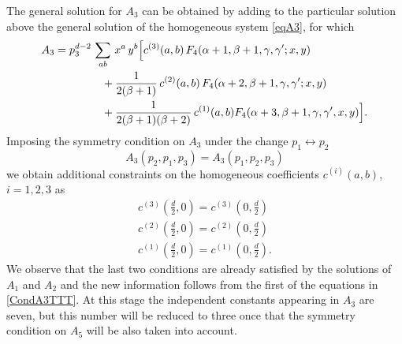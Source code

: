 \documentclass[a4paper,11pt,openright,twoside]{book}
\let\a=\alpha   \let\b=\beta   \let\g=\gamma   \let\d=\delta
\numberwithin{equation}{section}
\begin{document}
{{The general solution for $A_3$ can be obtained by adding to the particular solution above the general solution of the homogeneous system \eqref{eqA3}, for which
\begin{align}
A_3&=p_3^{d-2}\,\sum_{ab}\,x^a\,y^b\Big[c^{(3)}(a,b)\,F_4(\a+1,\b+1,\g,\g';x,y)\notag\\
&\hspace{1.5cm}+\frac{1}{2(\b+1)}\,c^{(2)}(a,b)\,F_4(\a+2,\b+1,\g,\g';x,y)\notag\\
&\hspace{1.5cm}+\frac{1}{2(\b+1)(\b+2)}\,c^{(1)}(a,b)F_4(\alpha+3,\beta+1,\gamma,\gamma',x,y)
\Big].
\end{align}
Imposing the symmetry condition on $A_3$ under the change $p_1\leftrightarrow p_2$
\begin{equation}
A_3(p_2,p_1,p_3)=A_3(p_1,p_2,p_3)
\end{equation}
we obtain additional constraints on the homogeneous coefficients $c^{(i)}(a,b)$, $i=1,2,3$ as
\begin{equation}
\label{CondA3TTT}
\begin{split}
	c^{(3)}\left(\frac{d}{2},0\right)=c^{(3)}\left(0,\frac{d}{2}\right)\\
	c^{(2)}\left(\frac{d}{2},0\right)=c^{(2)}\left(0,\frac{d}{2}\right)\\
	c^{(1)}\left(\frac{d}{2},0\right)=c^{(1)}\left(0,\frac{d}{2}\right).
\end{split}
\end{equation}
We observe that the last two conditions are already satisfied by the solutions of $A_1$ and $A_2$ and the new information follows from the first of the equations in \eqref{CondA3TTT}. At this stage the independent constants appearing in $A_3$ are seven, but this number will be reduced to three once that the symmetry condition on $A_5$ will be also taken into account. 
}}
\end{document}
